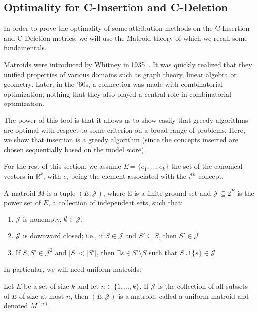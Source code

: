 \subsection{Optimality for C-Insertion and C-Deletion}\label{sup:holistic:matroid}

In order to prove the optimality of some attribution methods on the C-Insertion and C-Deletion metrics, we will use the Matroid theory of which we recall some fundamentals.




Matroids were introduced by Whitney in 1935~\cite{whitney1992abstract}. 
It was quickly realized that they unified properties of various domains such as graph theory, linear algebra or geometry. 
Later, in the '60s, a connection was made with combinatorial optimization, nothing that they also played a central role in combinatorial optimization. 

The power of this tool is that it allows us to show easily that greedy algorithms are optimal with respect to some criterion on a broad range of problems. Here, we show that insertion is a greedy algorithm (since the concepts inserted are chosen sequentially based on the model score).

For the rest of this section, we assume $E = \{ e_1, \ldots, e_k \}$ the set of the canonical vectors in $\mathbb{R}^k$, with $e_i$ being the element associated with the $i^{th}$ concept.

\begin{definition}[Matroid] A matroid $M$ is a tuple $(E, \mathcal{J})$, where E is a finite ground set and $\mathcal{J} \subseteq 2^E$ is the power set of $E$, a collection of independent sets, such that:

\begin{enumerate}
  \item $\mathcal{J}$ is nonempty, $\emptyset \in \mathcal{J}$.
  \item $\mathcal{J}$ is downward closed; i.e., if $S \in \mathcal{J}$ and $S' \subseteq S$, then $S' \in \mathcal{J}$ 
  \item If $S, S' \in \mathcal{J}^2$ and $|S| < |S'|$, then $\exists s \in S' \setminus S$ such that $S \cup \{s\} \in \mathcal{J}$
\end{enumerate}

\end{definition}

In particular, we will need uniform matroids: 

\begin{definition} 
\label{def:matroid}
Let $E$ be a set of size $k$ and let $n \in \{1, \ldots, k \}$. If $\mathcal{J}$ is the collection of all subsets of $E$ of size at most $n$, then $(E, \mathcal{J})$ is a matroid, called a uniform matroid and denoted $M^{(n)}$.
\end{definition}


